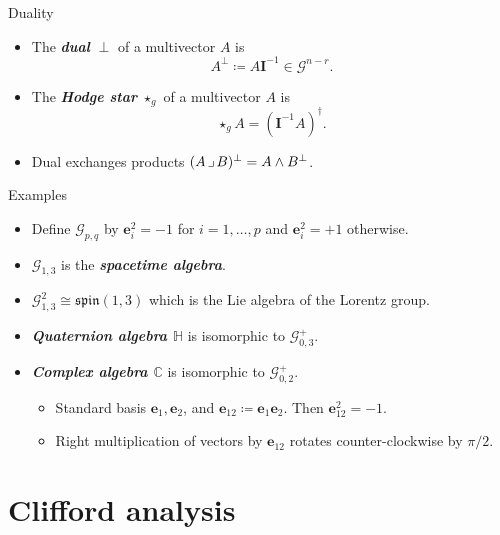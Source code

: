 \documentclass[aspectratio=169,handout]{beamer}
\newcommand\boldgreen[1]{\textcolor{lighter_csu_green}{\emph{\textbf{#1}}}}
\newcommand{\C}{\mathbb{C}}
\newcommand{\G}{\mathcal{G}}
\newcommand{\blade}[1]{\boldsymbol{#1}}
\newcommand{\pseudoscalar}{\blade{I}}
\newcommand{\contract}{\hspace*{.5mm} \lrcorner \hspace*{.5mm}}
\begin{document}
\begin{frame}{Duality}
\vfill
\begin{itemize}
\pause
\item The \boldgreen{dual} $\perp$ of a multivector $A$ is
\[
A^\perp \coloneqq A \pseudoscalar^{-1} \in \G^{n-r}.
\]
\pause
\item The \boldgreen{Hodge star} $\star_g$ of a multivector $A$ is
\[
\star_g A = (\pseudoscalar^{-1}A)^\dagger.
\]
\pause
\item Dual exchanges products $(A \contract B)^\perp = A \wedge B^\perp$.
\end{itemize}
\vfill
\end{frame}

\begin{frame}{Examples}
\vfill
\begin{itemize}
\pause
\item Define $\G_{p,q}$ by $\blade{e}_i^2=-1$ for $i=1,\dots,p$ and $\blade{e}_i^2=+1$ otherwise.
\pause
\item $\G_{1,3}$ is the \boldgreen{spacetime algebra}.
\pause
\item $\G_{1,3}^2 \cong \mathfrak{spin}(1,3)$ which is the Lie algebra of the Lorentz group.
\pause
\item \boldgreen{Quaternion algebra $\mathbb{H}$} is isomorphic to $\G_{0,3}^+$.
\pause
\item \boldgreen{Complex algebra $\C$} is isomorphic to $\G_{0,2}^+$.
\begin{itemize}
\pause
\item Standard basis $\blade{e}_1,\blade{e}_2$, and $\blade{e}_{12}\coloneqq \blade{e}_1\blade{e}_2$. Then $\blade{e}_{12}^2 = -1$.
\pause
\item Right multiplication of vectors by $\blade{e}_{12}$ rotates counter-clockwise by $\pi/2$.
\end{itemize}
\end{itemize}
\vfill
\end{frame}

\section{Clifford analysis}
\end{document}
